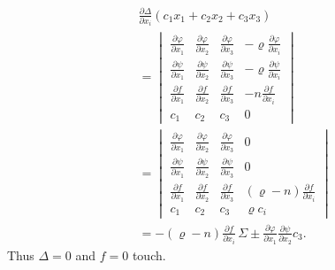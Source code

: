 \documentclass[10pt]{article}
\begin{document}
\[
\begin{aligned}
&\frac{\partial\Delta}{\partial x_i}(c_1x_1+c_2x_2+c_3x_3)\\
&=
\begin{vmatrix}
\frac{\partial\varphi}{\partial x_1}&\frac{\partial\varphi}{\partial x_2}&\frac{\partial\varphi}{\partial x_3}&-\varrho\frac{\partial\varphi}{\partial x_i}\\
\frac{\partial\psi}{\partial x_1}&\frac{\partial\psi}{\partial x_2}&\frac{\partial\psi}{\partial x_3}&-\varrho\frac{\partial\psi}{\partial x_i}\\
\frac{\partial f}{\partial x_1}&\frac{\partial f}{\partial x_2}&\frac{\partial f}{\partial x_3}&-n\frac{\partial f}{\partial x_i}\\
c_1&c_2&c_3&0
\end{vmatrix}\\
&=
\begin{vmatrix}
\frac{\partial\varphi}{\partial x_1}&\frac{\partial\varphi}{\partial x_2}&\frac{\partial\varphi}{\partial x_3}&0\\
\frac{\partial\psi}{\partial x_1}&\frac{\partial\psi}{\partial x_2}&\frac{\partial\psi}{\partial x_3}&0\\
\frac{\partial f}{\partial x_1}&\frac{\partial f}{\partial x_2}&\frac{\partial f}{\partial x_3}&(\varrho-n)\frac{\partial f}{\partial x_i}\\
c_1&c_2&c_3&\varrho c_i
\end{vmatrix}\\
&=-(\varrho-n)\frac{\partial f}{\partial x_i}\,
 \Sigma\pm
 \frac{\partial\varphi}{\partial x_1}
 \frac{\partial\psi}{\partial x_2}c_3.
\end{aligned}
\]
Thus \(\Delta=0\) and \(f=0\) touch.
\end{document}
